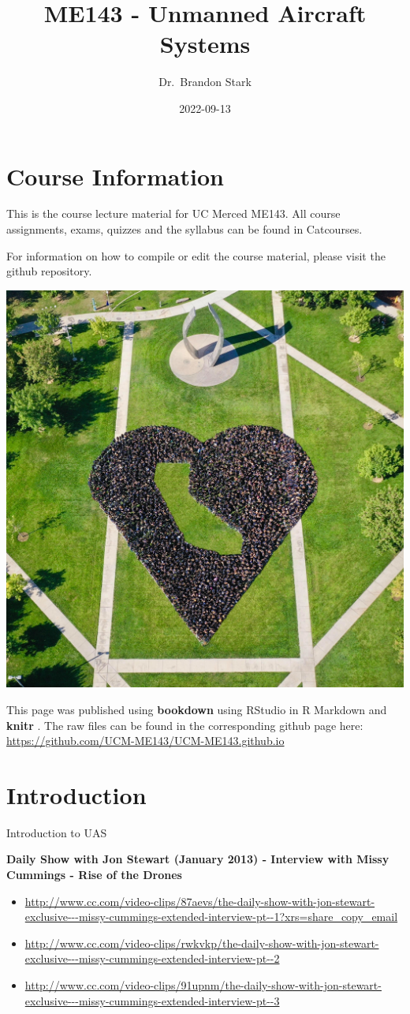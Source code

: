 \documentclass[
]{book}
\title{ME143 - Unmanned Aircraft Systems}
\author{Dr.~Brandon Stark}
\date{2022-09-13}
\providecommand{\tightlist}{%
  \setlength{\itemsep}{0pt}\setlength{\parskip}{0pt}}
\theoremstyle{definition}
\theoremstyle{definition}
\theoremstyle{definition}
\theoremstyle{definition}
\theoremstyle{remark}
\begin{document}
\maketitle

{
\setcounter{tocdepth}{1}
\tableofcontents
}
\hypertarget{course-information}{%
\chapter{Course Information}\label{course-information}}

This is the course lecture material for UC Merced ME143. All course assignments, exams, quizzes and the syllabus can be found in Catcourses.

For information on how to compile or edit the course material, please visit the github repository.

\begin{center}\includegraphics[width=0.5\linewidth]{images/general/UCM_heart} \end{center}

This page was published using \textbf{bookdown}\citep{R-bookdown} using RStudio in R Markdown and \textbf{knitr} \citep{xie2015}. The raw files can be found in the corresponding github page here: \url{https://github.com/UCM-ME143/UCM-ME143.github.io}

\hypertarget{ch-intro}{%
\chapter{Introduction}\label{ch-intro}}

Introduction to UAS

\textbf{Daily Show with Jon Stewart (January 2013) - Interview with Missy Cummings - Rise of the Drones}

\begin{itemize}
\tightlist
\item
  \url{http://www.cc.com/video-clips/87aevs/the-daily-show-with-jon-stewart-exclusive---missy-cummings-extended-interview-pt--1?xrs=share_copy_email}
\item
  \url{http://www.cc.com/video-clips/rwkvkp/the-daily-show-with-jon-stewart-exclusive---missy-cummings-extended-interview-pt--2}
\item
  \url{http://www.cc.com/video-clips/91upnm/the-daily-show-with-jon-stewart-exclusive---missy-cummings-extended-interview-pt--3}
\end{itemize}
\end{document}
